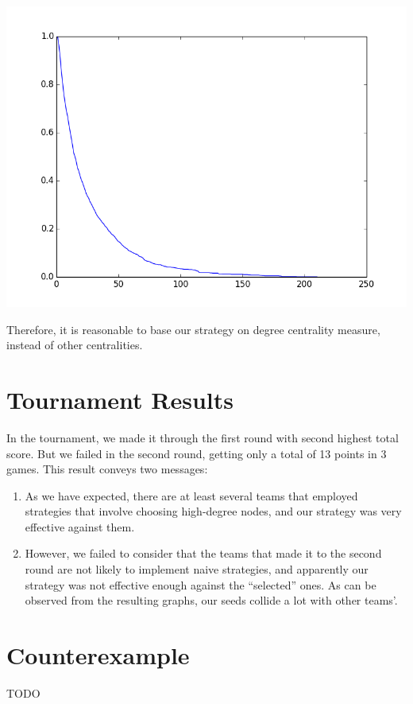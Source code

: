 \documentclass[12pt]{article}
\begin{document}
\begin{center}
\includegraphics[scale = 0.8]{webgraph_ccdf}
\end{center}
Therefore, it is reasonable to base our strategy on degree centrality measure, instead of other centralities. 


\section{Tournament Results}
In the tournament, we made it through the first round with second highest total score. But we failed in the second round, getting only a total of 13 points in 3 games. This result conveys two messages:
\begin{enumerate}
\item As we have expected, there are at least several teams that employed strategies that involve choosing high-degree nodes, and our strategy was very effective against them. 
\item However, we failed to consider that the teams that made it to the second round are not likely to implement naive strategies, and apparently our strategy was not effective enough against the ``selected'' ones. As can be observed from the resulting graphs, our seeds collide a lot with other teams'.
\end{enumerate}

\section{Counterexample}
TODO\\
\end{document}
